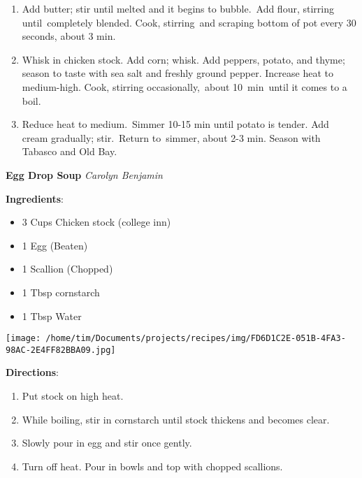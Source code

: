 \documentclass[11pt, twoside, openany]{book}
\begin{document}
\begin{minipage}[t]{\linewidth}
\begin{enumerate}
\item Add butter; stir until melted and it begins to bubble. Add flour, stirring until completely blended. Cook, stirring and scraping bottom of pot every 30 seconds, about 3 min.
\item Whisk in chicken stock. Add corn; whisk. Add peppers, potato, and thyme; season to taste with sea salt and freshly ground pepper. Increase heat to medium-high. Cook, stirring occasionally, about 10 min until it comes to a boil.
\item Reduce heat to medium. Simmer 10-15 min until potato is tender. Add cream gradually; stir. Return to simmer, about 2-3 min. Season with Tabasco and Old Bay.
\end{enumerate}
\end{minipage}\vspace{8mm}
\noindent\begin{minipage}[t]{\linewidth}%
{\Large\textbf{Egg Drop Soup}} \label{egg-drop-soup}\hfill\textit{Carolyn Benjamin}\\
\noindent\begin{minipage}[t]{0.78\linewidth}%
\textbf{Ingredients}:\vspace{-3mm}
\begin{multicols}{2}
\begin{itemize}\setlength\itemsep{-1mm}
\item 3 Cups Chicken stock (college inn)
\item 1 Egg (Beaten)
\item 1 Scallion (Chopped)
\item 1 Tbsp cornstarch
\item 1 Tbsp Water
\end{itemize}
\end{multicols}
\end{minipage}
\noindent\begin{minipage}[t]{0.18\linewidth}
\centering \strut\vspace*{-\baselineskip}\newline
\texttt{[image: /home/tim/Documents/projects/recipes/img/FD6D1C2E-051B-4FA3-98AC-2E4FF82BBA09.jpg]}\\
\end{minipage}\vspace{3mm}
\textbf{Directions}:
\vspace{-3mm}\begin{enumerate}\setlength\itemsep{-1mm}
\item Put stock on high heat.
\item While boiling, stir in cornstarch until stock thickens and becomes clear.
\item Slowly pour in egg and stir once gently.
\item Turn off heat. Pour in bowls and top with chopped scallions.
\end{enumerate}
\end{minipage}\vspace{8mm}
\end{document}
